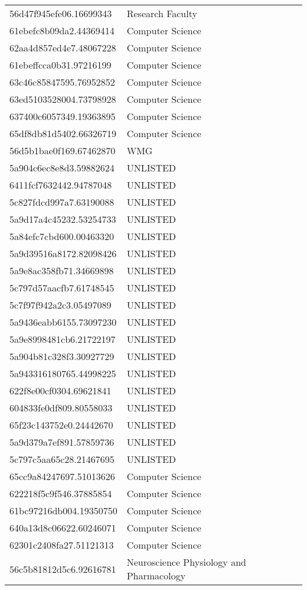 \begin{tabular}{ll}
56d47f945efe06.16699343 & Research Faculty \\
61ebefc8b09da2.44369414 & Computer Science \\
62aa4d857ed4e7.48067228 & Computer Science \\
61ebeffcca0b31.97216199 & Computer Science \\
63c46c85847595.76952852 & Computer Science \\
63ed5103528004.73798928 & Computer Science \\
637400c6057349.19363895 & Computer Science \\
65df8db81d5402.66326719 & Computer Science \\
56d5b1bae0f169.67462870 & WMG \\
5a904c6ec8e8d3.59882624 & UNLISTED \\
6411fcf7632442.94787048 & UNLISTED \\
5c827fdcd997a7.63190088 & UNLISTED \\
5a9d17a4c45232.53254733 & UNLISTED \\
5a84efc7cbd600.00463320 & UNLISTED \\
5a9d39516a8172.82098426 & UNLISTED \\
5a9e8ac358fb71.34669898 & UNLISTED \\
5c797d57aacfb7.61748545 & UNLISTED \\
5c7f97f942a2c3.05497089 & UNLISTED \\
5a9436eabb6155.73097230 & UNLISTED \\
5a9e8998481cb6.21722197 & UNLISTED \\
5a904b81c328f3.30927729 & UNLISTED \\
5a943316180765.44998225 & UNLISTED \\
622f8e00cf0304.69621841 & UNLISTED \\
604833fe0df809.80558033 & UNLISTED \\
65f23c143752e0.24442670 & UNLISTED \\
5a9d379a7ef891.57859736 & UNLISTED \\
5c797c5aa65c28.21467695 & UNLISTED \\
65cc9a84247697.51013626 & Computer Science \\
622218f5c9f546.37885854 & Computer Science \\
61bc97216db004.19350750 & Computer Science \\
640a13d8c06622.60246071 & Computer Science \\
62301c2408fa27.51121313 & Computer Science \\
56c5b81812d5c6.92616781 & Neuroscience Physiology and Pharmacology \\

\end{tabular}
